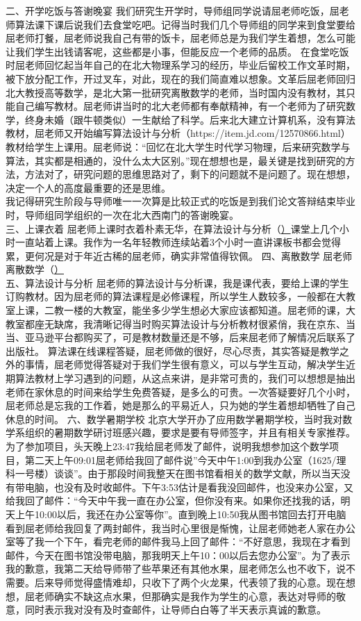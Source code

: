 \documentclass[12pt,twiside,a4paper]{ctexbook}
\numberwithin{chapter}{part}
\begin{document}
二、开学吃饭与答谢晚宴    我们研究生开学时，导师组同学说请屈老师吃饭，屈老师算法课下课后说我们去食堂吃吧。记得当时我们几个导师组的同学来到食堂要给屈老师打餐，屈老师说我自己有带的饭卡，屈老师总是为我们学生着想，怎么可能让我们学生出钱请客呢，这些都是小事，但能反应一个老师的品质。    在食堂吃饭时屈老师回忆起当年自己的在北大物理系学习的经历，毕业后留校工作文革时期，被下放分配工作，开过叉车，对此，现在的我们简直难以想象。文革后屈老师回归北大教授高等数学，是北大第一批研究离散数学的老师，当时国内没有教材，其只能自己编写教材。屈老师讲当时的北大老师都有奉献精神，有一个老师为了研究数学，终身未婚（跟牛顿类似）一生献给了科学。后来北大建立计算机系，没有算法教材，屈老师又开始编写算法设计与分析（https://item.jd.com/12570866.html）教材给学生上课用。屈老师说：“回忆在北大学生时代学习物理，后来研究数学与算法，其实都是相通的，没什么太大区别。”现在想想也是，最关键是找到研究的方法，方法对了，研究问题的思维思路对了，剩下的问题就不是问题了。现在想想，决定一个人的高度最重要的还是思维。\\
    我记得研究生阶段与导师唯一一次算是比较正式的吃饭是到我们论文答辩结束毕业时，导师组同学组织的一次在北大西南门的答谢晚宴。\\
三、上课衣着    屈老师上课时衣着朴素无华，在算法设计与分析（\href{https://www.icourse163.org/course/PKU-1002525003}）课堂上几个小时一直站着上课。我作为一名年轻教师连续站着3个小时一直讲课板书都会觉得累，更何况是对于年近古稀的屈老师，确实非常值得钦佩。
四、离散数学    屈老师离散数学（\href{https://item.jd.com/11633329.html}）\\
五、算法设计与分析    屈老师的算法设计与分析课，我是课代表，要给上课的学生订购教材。因为屈老师的算法课程是必修课程，所以学生人数较多，一般都在大教室上课，二教一楼的大教室，能坐多少学生想必大家应该都知道。屈老师的课，大教室都座无缺席，我清晰记得当时购买算法设计与分析教材很紧俏，我在京东、当当、亚马逊平台都购买了，可是教材数量还是不够，后来屈老师了解情况后联系了出版社。    算法课在线课程答疑，屈老师做的很好，尽心尽责，其实答疑是教学之外的事情，屈老师觉得答疑对于我们学生很有意义，可以与学生互动，解决学生近期算法教材上学习遇到的问题，从这点来讲，是非常可贵的，我们可以想想是抽出老师在家休息的时间来给学生免费答疑，是多么的可贵。一次答疑要好几个小时，屈老师总是忘我的工作着，她是那么的平易近人，只为她的学生着想却牺牲了自己休息的时间。
六、数学暑期学校    北京大学开办了应用数学暑期学校，当时我对数学系组织的暑期数学研讨班感兴趣，要求是要有导师签字，并且有相关专家推荐。为了参加项目，头天晚上23:47我给屈老师发了邮件，说明我想参加这个数学项目，第二天上午09:01屈老师给我回了邮件说”今天中午1:00到我办公室（1625/理科一号楼）谈谈”。由于那段时间我整天在图书馆看相关的数学文献，所以当天没有带电脑，也没有及时收邮件。下午3:53估计是看我没回邮件，也没来办公室，又给我回了邮件：“今天中午我一直在办公室，但你没有来。如果你还找我的话，明天上午10:00以后，我还在办公室等你”。直到晚上10:50我从图书馆回去打开电脑看到屈老师给我回复了两封邮件，我当时心里很是惭愧，让屈老师她老人家在办公室等了我一个下午，看完老师的邮件我马上回了邮件：“不好意思，我现在才看到邮件，今天在图书馆没带电脑，那我明天上午10：00以后去您办公室”。为了表示我的歉意，我第二天给导师带了些苹果还有其他水果，屈老师怎么也不收下，说不需要。后来导师觉得盛情难却，只收下了两个火龙果，代表领了我的心意。现在想想，屈老师确实不缺这点水果，但那确实是我作为学生的心意，表达对导师的敬意，同时表示我对没有及时查邮件，让导师白白等了半天表示真诚的歉意。
\end{document}
